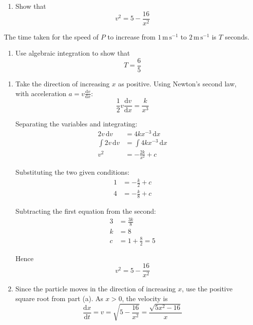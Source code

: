 \documentclass[leqno]{article}
\begin{document}
\begin{enumerate}[
  label=\textbf{\arabic*.},
  leftmargin=*,
  topsep=0pt,
  partopsep=0pt,
  parsep=0pt
]
\begin{enumerate}[label=\textbf{(\alph*)}]
  \item Show that
  \[
  v^2=5-\frac{16}{x^2}
  \]
\end{enumerate}
The time taken for the speed of $P$ to increase from $1\,\mathrm{m\,s^{-1}}$ to $2\,\mathrm{m\,s^{-1}}$ is $T$ seconds. \\
\begin{enumerate}[label=\textbf{(\alph*)}, resume]
  \item Use algebraic integration to show that
  \[
  T=\frac{6}{5}
  \]
\end{enumerate}

\vspace*{10pt}

\begin{djsSolution}
\begin{enumerate}[label=\textbf{(\alph*)}, start=1]
\item Take the direction of increasing \(x\) as positive. Using Newton's second law, with acceleration \(a=v\frac{\mathrm{d}v}{\mathrm{d}x}\):
\[
\frac12 v\frac{\mathrm{d}v}{\mathrm{d}x}=\frac{k}{x^3}
\]

Separating the variables and integrating:
\begin{align*}
2v\,\mathrm{d}v&=4kx^{-3}\,\mathrm{d}x\\
\int 2v\,\mathrm{d}v&=\int 4kx^{-3}\,\mathrm{d}x\\
v^2&=-\frac{2k}{x^2}+c
\end{align*}

Substituting the two given conditions:
\begin{align*}
1&=-\frac{k}{2}+c\\
4&=-\frac{k}{8}+c
\end{align*}

Subtracting the first equation from the second:
\begin{align*}
3&=\frac{3k}{8}\\
k&=8\\
c&=1+\frac{8}{2}=5
\end{align*}

Hence
\[
v^2=5-\frac{16}{x^2}
\]

\item Since the particle moves in the direction of increasing \(x\), use the positive square root from part (a). As \(x>0\), the velocity is
\[
\frac{\mathrm{d}x}{\mathrm{d}t}=v=\sqrt{5-\frac{16}{x^2}}=\frac{\sqrt{5x^2-16}}{x}
\]


\end{enumerate}
\end{djsSolution}
\end{enumerate}
\end{document}
